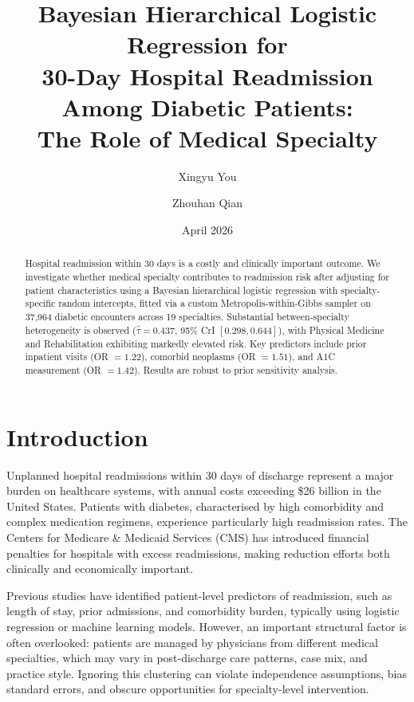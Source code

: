 \documentclass[10pt]{article}
\title{\textbf{Bayesian Hierarchical Logistic Regression for\\
       30-Day Hospital Readmission Among Diabetic Patients:\\
       The Role of Medical Specialty}}
\author{Xingyu You \and Zhouhan Qian}
\date{April 2026}
\begin{document}
\maketitle

\begin{abstract}
Hospital readmission within 30 days is a costly and clinically important outcome. We investigate whether medical specialty contributes to readmission risk after adjusting for patient characteristics using a Bayesian hierarchical logistic regression with specialty-specific random intercepts, fitted via a custom Metropolis-within-Gibbs sampler on 37{,}964 diabetic encounters across 19 specialties. Substantial between-specialty heterogeneity is observed ($\hat{\tau} = 0.437$, 95\% CrI $[0.298, 0.644]$), with Physical Medicine and Rehabilitation exhibiting markedly elevated risk. Key predictors include prior inpatient visits (OR $= 1.22$), comorbid neoplasms (OR $= 1.51$), and A1C measurement (OR $= 1.42$). Results are robust to prior sensitivity analysis.
\end{abstract}

\section{Introduction}

Unplanned hospital readmissions within 30 days of discharge represent a major burden on healthcare systems, with annual costs exceeding \$26 billion in the United States. Patients with diabetes, characterised by high comorbidity and complex medication regimens, experience particularly high readmission rates. The Centers for Medicare \& Medicaid Services (CMS) has introduced financial penalties for hospitals with excess readmissions, making reduction efforts both clinically and economically important.

Previous studies have identified patient-level predictors of readmission, such as length of stay, prior admissions, and comorbidity burden, typically using logistic regression or machine learning models. However, an important structural factor is often overlooked: patients are managed by physicians from different medical specialties, which may vary in post-discharge care patterns, case mix, and practice style. Ignoring this clustering can violate independence assumptions, bias standard errors, and obscure opportunities for specialty-level intervention.
\end{document}
